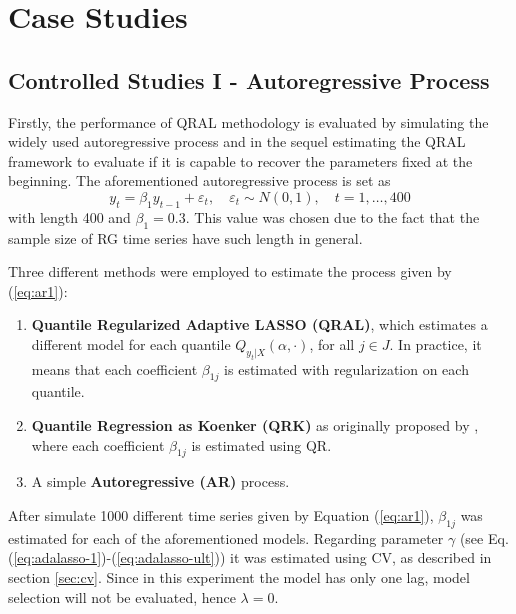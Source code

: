 \chapter{Case Studies}


\section{Controlled Studies I - Autoregressive Process} \label{sec:ar-study}


Firstly, the performance of QRAL methodology is evaluated by simulating the widely used autoregressive process and in the sequel estimating the QRAL framework to evaluate if it is capable to recover the parameters fixed at the beginning. 
The aforementioned autoregressive process is set as
\begin{equation}
y_t = \beta_1 y_{t-1} + \varepsilon_t, \quad \varepsilon_t \sim N(0, 1), \quad t=1,\dots,400 \label{eq:ar1}
\end{equation}
with length 400 and $\beta_1 = 0.3$. This value was chosen due to the fact that the sample size of RG time series have such length in general.

Three different methods were employed to estimate the process given by (\ref{eq:ar1}):
\begin{enumerate}
\item \textbf{Quantile Regularized Adaptive LASSO (QRAL)}, which estimates a different model for each quantile $Q_{y_t|X}(\alpha,\cdot)$, for all ${j \in J}$. In practice, it means that each coefficient $\beta_{1j}$ is estimated with regularization on each quantile. %
\item \textbf{Quantile Regression as Koenker (QRK)} as originally proposed by \cite{koenker1978regression}, where each coefficient $\beta_{1j}$ is estimated using QR. 
\item A simple \textbf{Autoregressive (AR)} process.%


\end{enumerate}

After simulate 1000 different time series given by Equation (\ref{eq:ar1}), $\beta_{1j}$ was estimated for each of the aforementioned models. Regarding parameter $\gamma$ (see Eq. (\ref{eq:adalasso-1})-(\ref{eq:adalasso-ult})) it was estimated using CV, as described in section \ref{sec:cv}. Since in this experiment the model has only one lag, model selection will not be evaluated, hence $\lambda=0$.


